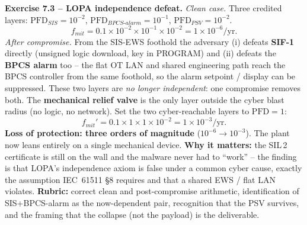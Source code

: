 \documentclass[11pt,a4paper]{article}
\begin{document}
\begin{solutionbox}
\textbf{Exercise 7.3 -- LOPA independence defeat.}
\emph{Clean case.} Three credited layers:
$\mathrm{PFD}_{SIS}=10^{-2}$, $\mathrm{PFD}_{BPCS\text{-}alarm}=10^{-1}$,
$\mathrm{PFD}_{PSV}=10^{-2}$.
\[
f_{mit}=0.1\times10^{-2}\times10^{-1}\times10^{-2}=1\times10^{-6}/\mathrm{yr}.
\]
\emph{After compromise.} From the SIS-EWS foothold the adversary (i) defeats
\textbf{SIF-1} directly (unsigned logic download, key in PROGRAM) and (ii)
defeats the \textbf{BPCS alarm} too -- the flat OT LAN and shared engineering
path reach the BPCS controller from the same foothold, so the alarm setpoint /
display can be suppressed. These two layers are \emph{no longer independent}:
one compromise removes both. The \textbf{mechanical relief valve} is the only
layer outside the cyber blast radius (no logic, no network).
Set the two cyber-reachable layers to $\mathrm{PFD}=1$:
\[
f_{mit}'=0.1\times 1\times 1\times10^{-2}=1\times10^{-3}/\mathrm{yr}.
\]
\textbf{Loss of protection: three orders of magnitude}
($10^{-6}\to10^{-3}$). The plant now leans entirely on a single mechanical
device. \textbf{Why it matters:} the SIL\,2 certificate is still on the wall
and the malware never had to ``work'' -- the finding is that LOPA's
independence axiom is false under a common cyber cause, exactly the assumption
IEC~61511 \S8 requires and that a shared EWS / flat LAN violates.
\textbf{Rubric:} correct clean and post-compromise arithmetic, identification
of SIS+BPCS-alarm as the now-dependent pair, recognition that the PSV survives,
and the framing that the collapse (not the payload) is the deliverable.
\end{solutionbox}
\end{document}
